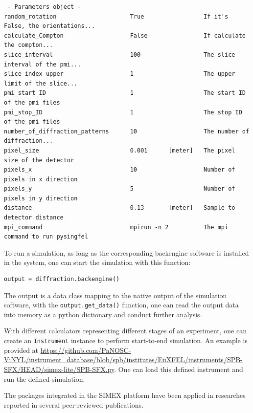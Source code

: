 \documentclass[11pt, a4paper]{article}
\begin{document}
\begin{lstlisting}
 - Parameters object -
random_rotation                     True                 If it's False, the orientations...
calculate_Compton                   False                If calculate the compton...   
slice_interval                      100                  The slice interval of the pmi...  
slice_index_upper                   1                    The upper limit of the slice...
pmi_start_ID                        1                    The start ID of the pmi files   
pmi_stop_ID                         1                    The stop ID of the pmi files   
number_of_diffraction_patterns      10                   The number of diffraction...
pixel_size                          0.001      [meter]   The pixel size of the detector   
pixels_x                            10                   Number of pixels in x direction   
pixels_y                            5                    Number of pixels in y direction   
distance                            0.13       [meter]   Sample to detector distance   
mpi_command                         mpirun -n 2          The mpi command to run pysingfel
\end{lstlisting}

To run a simulation, as long as the corresponding backengine software is installed in the system, one can start the simulation with this function:
\begin{lstlisting}
output = diffraction.backengine()
\end{lstlisting}

The output is a data class mapping to the native output of the simulation software, with the \verb|output.get_data()| function, one can read the output data into memory as a python dictionary and conduct further analysis.

With different calculators representing different stages of an experiment, one can create an \verb|Instrument| instance to perform start-to-end simulation. An example is provided at
\url{https://github.com/PaNOSC-ViNYL/instrument_database/blob/spb/institutes/EuXFEL/instruments/SPB-SFX/HEAD/simex-lite/SPB-SFX.py}. One can load this defined instrument and run the defined simulation.

The packages integrated in the SIMEX platform have been applied in researches reported in several peer-reviewed publications\cite{fortmann-grote2017iucrj,e2021,e2022}.
\end{document}
